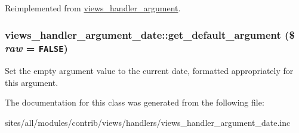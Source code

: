Reimplemented from \hyperlink{classviews__handler__argument_830cb037bee2daa385618a60d01c0dd1}{views\_\-handler\_\-argument}.\hypertarget{classviews__handler__argument__date_1e5320e475b9e86ed9acc59c9a525610}{
\subsubsection[{get\_\-default\_\-argument}]{\setlength{\rightskip}{0pt plus 5cm}views\_\-handler\_\-argument\_\-date::get\_\-default\_\-argument (\$ {\em raw} = {\tt FALSE})}}
\label{classviews__handler__argument__date_1e5320e475b9e86ed9acc59c9a525610}


Set the empty argument value to the current date, formatted appropriately for this argument. 

The documentation for this class was generated from the following file:\begin{CompactItemize}
\item 
sites/all/modules/contrib/views/handlers/views\_\-handler\_\-argument\_\-date.inc\end{CompactItemize}
